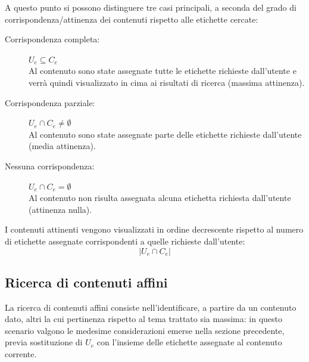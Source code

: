 \documentclass[10pt,a4paper,headinclude,footinclude,hidelinks]{scrreprt} %
\begin{document}
	A questo punto si possono distinguere tre casi principali, a seconda del grado di corrispondenza/attinenza dei contenuti rispetto alle etichette cercate:
	\begin{description}
	\item[Corrispondenza completa:] $U_e \subseteq C_e$ \hfill \\
	Al contenuto sono state assegnate tutte le etichette richieste dall'utente e verrà quindi visualizzato in cima ai risultati di ricerca (massima attinenza).
 	\item[Corrispondenza parziale:] $U_e \cap C_e \neq \emptyset$ \hfill \\
	Al contenuto sono state assegnate parte delle etichette richieste dall'utente (media attinenza).
	\item[Nessuna corrispondenza:] $U_e \cap C_e = \emptyset$\hfill \\
	Al contenuto non risulta assegnata alcuna etichetta richiesta dall'utente (attinenza nulla).
	\end{description}

	I contenuti attinenti vengono visualizzati in ordine decrescente rispetto al numero di etichette assegnate corrispondenti a quelle richieste dall'utente:
	$$\left|{U_e \cap C_e}\right|$$
	\subsection{Ricerca di contenuti affini}
	La ricerca di contenuti affini consiste nell'identificare, a partire da un contenuto dato, altri la cui pertinenza rispetto al tema trattato sia massima: in questo scenario valgono le medesime considerazioni emerse nella sezione precedente, previa sostituzione di $U_e$ con l'insieme delle etichette assegnate al contenuto corrente.
	

\end{document}
